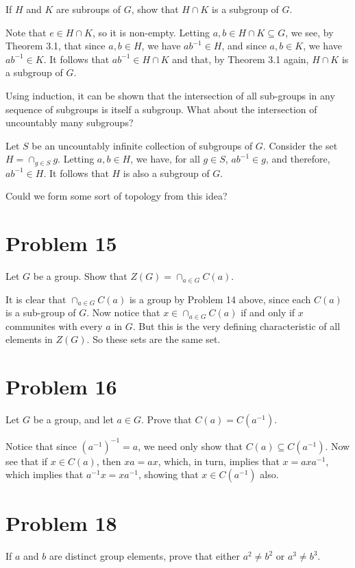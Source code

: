 \documentclass[12pt]{article}
\begin{document}
If $H$ and $K$ are subroups of $G$, show that $H\cap K$ is a subgroup of $G$.

Note that $e\in H\cap K$, so it is non-empty.  Letting $a,b\in H\cap K\subseteq G$, we
see, by Theorem 3.1, that since $a,b\in H$, we have $ab^{-1}\in H$, and
since $a,b\in K$, we have $ab^{-1}\in K$.  It follows that $ab^{-1}\in H\cap K$
and that, by Theorem 3.1 again, $H\cap K$ is a subgroup of $G$.

Using induction, it can be shown that the intersection of all sub-groups
in any sequence of subgroups is itself a subgroup.  What about the intersection
of uncountably many subgroups?

Let $S$ be an uncountably infinite collection of subgroups of $G$.
Consider the set $H = \cap_{g\in S} g$.  Letting $a,b\in H$,
we have, for all $g\in S$, $ab^{-1}\in g$, and therefore, $ab^{-1}\in H$.
It follows that $H$ is also a subgroup of $G$.

Could we form some sort of topology from this idea?

\section*{Problem 15}

Let $G$ be a group.  Show that $Z(G)=\cap_{a\in G} C(a)$.

It is clear that $\cap_{a\in G} C(a)$ is a group by Problem 14 above, since
each $C(a)$ is a sub-group of $G$.  Now notice that $x\in\cap_{a\in G} C(a)$ if and only if
$x$ communites with every $a$ in $G$.  But this is the very defining characteristic
of all elements in $Z(G)$.  So these sets are the same set.

\section*{Problem 16}

Let $G$ be a group, and let $a\in G$.  Prove that $C(a)=C(a^{-1})$.

Notice that since $(a^{-1})^{-1}=a$, we need only show that $C(a)\subseteq C(a^{-1})$.
Now see that if $x\in C(a)$, then $xa=ax$, which, in turn, implies that $x=axa^{-1}$,
which implies that $a^{-1}x=xa^{-1}$, showing that $x\in C(a^{-1})$ also.

\section*{Problem 18}

If $a$ and $b$ are distinct group elements, prove that either $a^2\neq b^2$ or $a^3\neq b^3$.
\end{document}
